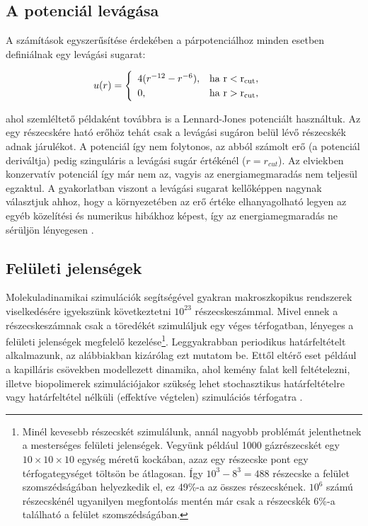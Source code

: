 \documentclass[12pt]{article}
\theoremstyle{plain}
\begin{document}
\subsection{A potenciál levágása}

A számítások egyszerűsítése érdekében a párpotenciálhoz minden esetben definiálnak egy levágási sugarat:

\begin{equation}
	u(r) = \begin{cases}
	\begin{array}{lr}
		4 (r^{-12} - r^{-6}), & \rm{ha} ~ r<r_{cut},\\
	    0,					  & \rm{ha} ~ r>r_{cut},
	\end{array}
	\end{cases}
\end{equation}

ahol szemléltető példaként továbbra is a Lennard-Jones potenciált használtuk.
Az egy részecskére ható erőhöz tehát csak a levágási sugáron belül lévő részecskék adnak járulékot. A potenciál így nem folytonos, az abból számolt erő (a potenciál deriváltja) pedig szinguláris a levágási sugár értékénél ($r= r_{cut}$). Az elviekben konzervatív potenciál így már nem az, vagyis az energiamegmaradás nem teljesül egzaktul. A gyakorlatban viszont a levágási sugarat kellőképpen nagynak választjuk ahhoz, hogy a környezetében az erő értéke elhanyagolható legyen az egyéb közelítési és numerikus hibákhoz képest, így az energiamegmaradás ne sérüljön lényegesen \cite{Landau2012}.


\subsection{Felületi jelenségek}

Molekuladinamikai szimulációk segítségével gyakran makroszkopikus rendszerek viselkedésére igyekszünk következtetni $10^{23}$ részecskeszámmal. Mivel ennek a részecskeszámnak csak a töredékét szimuláljuk egy véges térfogatban, lényeges a felületi jelenségek megfelelő kezelése\footnote{Minél kevesebb részecskét szimulálunk, annál nagyobb problémát jelenthetnek a mesterséges felületi jelenségek. Vegyünk például 1000 gázrészecskét egy $10\times 10 \times 10$ egység méretű kockában, azaz egy részecske pont egy térfogategységet töltsön be átlagosan. Így $10^3-8^3 = 488$ részecske a felület szomszédságában helyezkedik el, ez 49\%-a az összes részecskének. $10^6$ számú részecskénél ugyanilyen megfontolás mentén már csak a részecskék 6\%-a található a felület szomszédságában.}. Leggyakrabban periodikus határfeltételt alkalmazunk, az alábbiakban kizárólag ezt mutatom be. Ettől eltérő eset például a kapilláris csövekben modellezett dinamika, ahol kemény falat kell feltételezni, illetve biopolimerek szimulációjakor szükség lehet stochasztikus határfeltételre vagy határfeltétel nélküli (effektíve végtelen) szimulációs térfogatra \cite{lecture}. 
\end{document}
